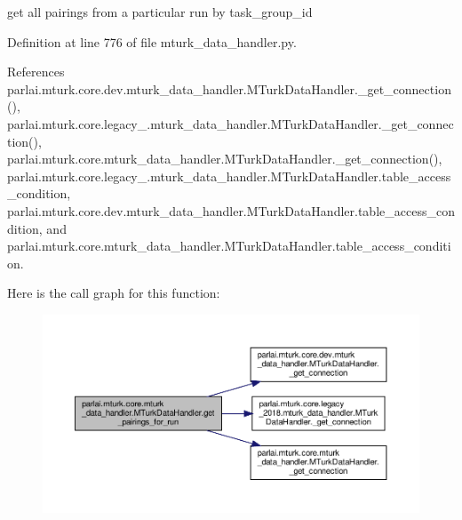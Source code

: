 \begin{DoxyVerb}get all pairings from a particular run by task_group_id\end{DoxyVerb}
 

Definition at line 776 of file mturk\+\_\+data\+\_\+handler.\+py.



References parlai.\+mturk.\+core.\+dev.\+mturk\+\_\+data\+\_\+handler.\+M\+Turk\+Data\+Handler.\+\_\+get\+\_\+connection(), parlai.\+mturk.\+core.\+legacy\+\_.\+mturk\+\_\+data\+\_\+handler.\+M\+Turk\+Data\+Handler.\+\_\+get\+\_\+connection(), parlai.\+mturk.\+core.\+mturk\+\_\+data\+\_\+handler.\+M\+Turk\+Data\+Handler.\+\_\+get\+\_\+connection(), parlai.\+mturk.\+core.\+legacy\+\_.\+mturk\+\_\+data\+\_\+handler.\+M\+Turk\+Data\+Handler.\+table\+\_\+access\+\_\+condition, parlai.\+mturk.\+core.\+dev.\+mturk\+\_\+data\+\_\+handler.\+M\+Turk\+Data\+Handler.\+table\+\_\+access\+\_\+condition, and parlai.\+mturk.\+core.\+mturk\+\_\+data\+\_\+handler.\+M\+Turk\+Data\+Handler.\+table\+\_\+access\+\_\+condition.

Here is the call graph for this function\+:
\nopagebreak
\begin{figure}[H]
\begin{center}
\leavevmode
\includegraphics[width=350pt]{classparlai_1_1mturk_1_1core_1_1mturk__data__handler_1_1MTurkDataHandler_a546d30ff4b76188f71e5309f7a881ab2_cgraph}
\end{center}
\end{figure}
\mbox{\label{classparlai_1_1mturk_1_1core_1_1mturk__data__handler_1_1MTurkDataHandler_a3ded92bcc9f19027c452489e2b06d837}} 
